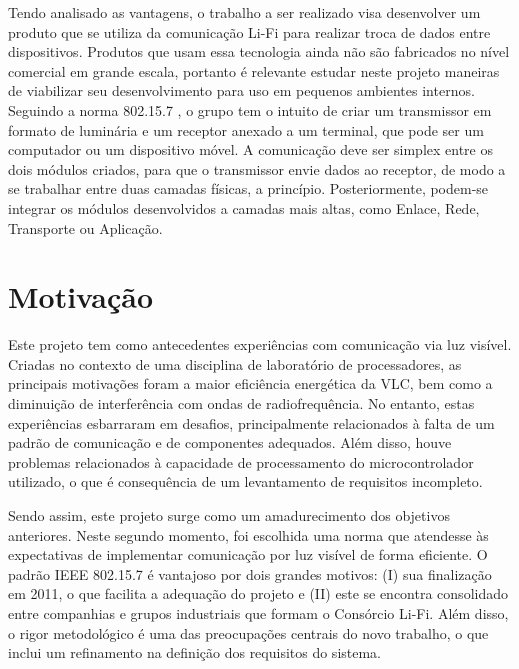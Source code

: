 	Tendo analisado as vantagens, o trabalho a ser realizado visa desenvolver um produto que se utiliza da comunicação Li-Fi para realizar troca de dados entre dispositivos. Produtos que usam essa tecnologia ainda não são fabricados no nível comercial em grande escala, portanto é relevante estudar neste projeto maneiras de viabilizar seu desenvolvimento para uso em pequenos ambientes internos. Seguindo a norma 802.15.7 \cite{lifi-standard}, o grupo tem o intuito de criar um transmissor em formato de luminária e um receptor anexado a um terminal, que pode ser um computador ou um dispositivo móvel. A comunicação deve ser simplex entre os dois módulos criados, para que o transmissor envie dados ao receptor, de modo a se trabalhar entre duas camadas físicas, a princípio. Posteriormente, podem-se integrar os módulos desenvolvidos a camadas mais altas, como Enlace, Rede, Transporte ou Aplicação. 

	
	\section{Motivação}\label{sec-motivacao}
	
	Este projeto tem como antecedentes experiências com comunicação via luz visível. Criadas no contexto de uma disciplina de laboratório de processadores, as principais motivações foram a maior eficiência energética da VLC, bem como a diminuição de interferência com ondas de radiofrequência. No entanto, estas experiências esbarraram em desafios, principalmente relacionados à falta de um padrão de comunicação e de componentes adequados. Além disso, houve problemas relacionados à capacidade de processamento do microcontrolador utilizado, o que é consequência de um levantamento de requisitos incompleto.
	
	Sendo assim, este projeto surge como um amadurecimento dos objetivos anteriores. Neste segundo momento, foi escolhida uma norma que atendesse às expectativas de implementar comunicação por luz visível de forma eficiente. O padrão IEEE 802.15.7 é vantajoso por dois grandes motivos:
	(I) sua finalização em 2011, o que facilita a adequação do projeto e (II) este se encontra consolidado entre companhias e grupos industriais que formam o Consórcio Li-Fi. Além disso, o rigor metodológico é uma das preocupações centrais do novo trabalho, o que inclui um refinamento na definição dos requisitos do sistema.
	
	